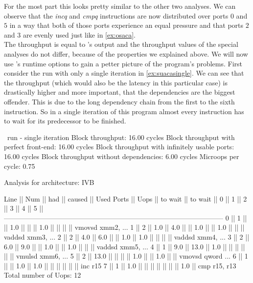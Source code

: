 For the most part this looks pretty similar to the other two analyses. We can observe that the \emph{incq} and \emph{cmpq} instructions are now distributed over ports $0$ and $5$ in a way that both of those ports experience an equal pressure and that ports $2$ and $3$ are evenly used just like in \autoref{ex:osaca}.\\
The throughput is equal to \iaca's output and the throughput values of the special analyses do not differ, because of the properties we explained above. We will now use \suaca's runtime options to gain a petter picture of the program's problems. First consider the run with only a single iteration in \autoref{ex:suacasingle}. We can see that the throughput (which would also be the latency in this particular case) is drastically higher and more important, that the dependencies are the biggest offender. This is due to the long dependency chain from the first to the sixth instruction. So in a single iteration of this program almost every instruction has to wait for its predecessor to be finished.

\begin{LabeledExample}{\suaca\ run - single iteration}{\label{ex:suacasingle}}
    Block throughput: 16.00 cycles
    Block throughput with perfect front-end: 16.00 cycles
    Block throughput with infinitely usable ports: 16.00 cycles
    Block throughput without dependencies: 6.00 cycles
    Microops per cycle: 0.75
    
    Analysis for architecture: IVB
    
     Line  ||   Num   ||   had   || caused  ||            Used Ports
           ||   Uops  || to wait || to wait ||   0   ||   1   ||   2   ||   3   ||   4   ||   5   ||
     ------------------------------------------------------------------------------------------------
       0   ||    1    ||         ||   1.0   ||       ||       ||  1.0  ||       ||       ||       || vmovsd xmm2, ...
       1   ||    2    ||   1.0   ||   4.0   ||       ||  1.0  ||       ||  1.0  ||       ||       || vaddsd xmm3, ...
       2   ||    2    ||   4.0   ||   6.0   ||       ||  1.0  ||  1.0  ||       ||       ||       || vaddsd xmm4, ...
       3   ||    2    ||   6.0   ||   9.0   ||       ||  1.0  ||       ||  1.0  ||       ||       || vaddsd xmm5, ...
       4   ||    1    ||   9.0   ||  13.0   ||  1.0  ||       ||       ||       ||       ||       || vmulsd xmm6, ...
       5   ||    2    ||  13.0   ||         ||       ||       ||  1.0  ||       ||  1.0  ||       || vmovsd qword ...
       6   ||    1    ||         ||   1.0   ||  1.0  ||       ||       ||       ||       ||       || inc r15
       7   ||    1    ||   1.0   ||         ||       ||       ||       ||       ||       ||  1.0  || cmp r15, r13
    Total number of Uops: 12
\end{LabeledExample}

